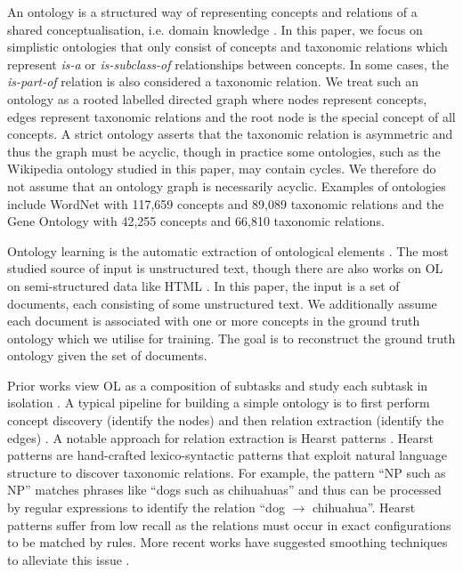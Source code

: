 \documentclass{article}
\begin{document}
An ontology is a structured way of representing concepts and relations of a shared conceptualisation, i.e. domain knowledge \cite{gruber1995toward,gruber1993translation}. In this paper, we focus on simplistic ontologies that only consist of concepts and taxonomic relations which represent \emph{is-a} or \emph{is-subclass-of} relationships between concepts. In some cases, the \emph{is-part-of} relation is also considered a taxonomic relation. We treat such an ontology as a rooted labelled directed graph where nodes represent concepts, edges represent taxonomic relations and the root node is the special concept of all concepts. A strict ontology asserts that the taxonomic relation is asymmetric and thus the graph must be acyclic, though in practice some ontologies, such as the Wikipedia ontology studied in this paper, may contain cycles. We therefore do not assume that an ontology graph is necessarily acyclic. Examples of ontologies include WordNet \cite{miller1995wordnet} with 117,659 concepts and 89,089 taxonomic relations and the Gene Ontology \cite{ashburner2000gene} with 42,255 concepts and 66,810 taxonomic relations.

Ontology learning is the automatic extraction of ontological elements \cite{hazman2011survey}. The most studied source of input is unstructured text, though there are also works on OL on semi-structured data like HTML \cite{karoui2004ontology}. In this paper, the input is a set of documents, each consisting of some unstructured text. We additionally assume each document is associated with one or more concepts in the ground truth ontology which we utilise for training. The goal is to reconstruct the ground truth ontology given the set of documents. 

Prior works view OL as a composition of subtasks and study each subtask in isolation \cite{buitelaar2005ontology,asim2018survey}. A typical pipeline for building a simple ontology is to first perform concept discovery (identify the nodes) and then relation extraction (identify the edges) \cite{cimiano2005text2onto,kaushik2018automatic}. A notable approach for relation extraction is Hearst patterns \cite{hearst1998automated}. Hearst patterns are hand-crafted lexico-syntactic patterns that exploit natural language structure to discover taxonomic relations. For example, the pattern ``NP such as NP'' matches phrases like ``dogs such as chihuahuas'' and thus can be processed by regular expressions to identify the relation ``dog $\to$ chihuahua''. Hearst patterns suffer from low recall as the relations must occur in exact configurations to be matched by rules. More recent works have suggested smoothing techniques to alleviate this issue \cite{roller2018hearst}.
\end{document}
